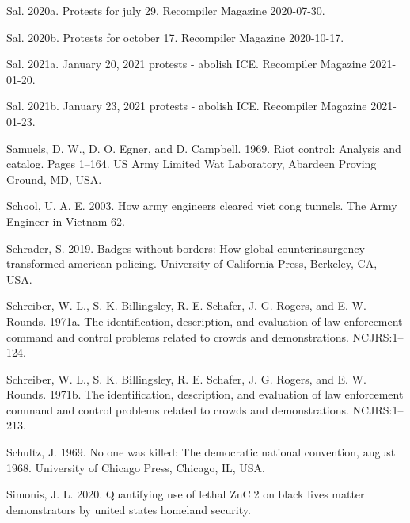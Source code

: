 \documentclass[
  11pt,
]{krantz}
\newlength{\cslhangindent}
\newenvironment{CSLReferences}[2] %
 {%
  \setlength{\parindent}{0pt}
  \ifodd #1 \everypar{\setlength{\hangindent}{\cslhangindent}}\ignorespaces\fi
  \ifnum #2 > 0
  \setlength{\parskip}{#2\baselineskip}
  \fi
 }%
 {}
\begin{document}
\begin{CSLReferences}{1}{0}
\leavevmode{}%
Sal. 2020a. Protests for july 29. Recompiler Magazine 2020-07-30.

\leavevmode{}%
Sal. 2020b. Protests for october 17. Recompiler Magazine 2020-10-17.

\leavevmode{}%
Sal. 2021a. January 20, 2021 protests - abolish ICE. Recompiler Magazine 2021-01-20.

\leavevmode{}%
Sal. 2021b. January 23, 2021 protests - abolish ICE. Recompiler Magazine 2021-01-23.

\leavevmode{}%
Samuels, D. W., D. O. Egner, and D. Campbell. 1969. Riot control: Analysis and catalog. Pages 1--164. US Army Limited Wat Laboratory, Abardeen Proving Ground, MD, USA.

\leavevmode{}%
School, U. A. E. 2003. How army engineers cleared viet cong tunnels. The Army Engineer in Vietnam 62.

\leavevmode{}%
Schrader, S. 2019. Badges without borders: How global counterinsurgency transformed american policing. University of California Press, Berkeley, CA, USA.

\leavevmode{}%
Schreiber, W. L., S. K. Billingsley, R. E. Schafer, J. G. Rogers, and E. W. Rounds. 1971a. The identification, description, and evaluation of law enforcement command and control problems related to crowds and demonstrations. NCJRS:1--124.

\leavevmode{}%
Schreiber, W. L., S. K. Billingsley, R. E. Schafer, J. G. Rogers, and E. W. Rounds. 1971b. The identification, description, and evaluation of law enforcement command and control problems related to crowds and demonstrations. NCJRS:1--213.

\leavevmode{}%
Schultz, J. 1969. No one was killed: The democratic national convention, august 1968. University of Chicago Press, Chicago, IL, USA.

\leavevmode{}%
Simonis, J. L. 2020. Quantifying use of lethal ZnCl2 on black lives matter demonstrators by united states homeland security.


\end{CSLReferences}
\end{document}
